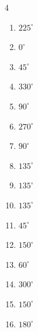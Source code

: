 \begin{multicols}{4}
\begin{enumerate}
  \item $\displaystyle 225^{\circ}$

  \item $\displaystyle 0^{\circ}$
        \phantom{$\displaystyle =0$}

  \item $\displaystyle 45^{\circ}$

  \item $\displaystyle 330^{\circ}$

  \item $\displaystyle 90^{\circ}$

  \item $\displaystyle 270^{\circ}$

  \item $\displaystyle 90^{\circ}$

\columnbreak %

  \item $\displaystyle 135^{\circ}$

  \item $\displaystyle 135^{\circ}$

  \item $\displaystyle 135^{\circ}$

  \item $\displaystyle 45^{\circ}$

  \item $\displaystyle 150^{\circ}$

  \item $\displaystyle 60^{\circ}$

  \item $\displaystyle 300^{\circ}$

  \item $\displaystyle 150^{\circ}$

  \item $\displaystyle 180^{\circ}$
        \phantom{$\displaystyle =\pi$}


\end{enumerate}
\end{multicols}
